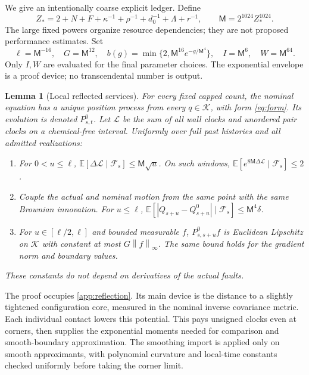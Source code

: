 \documentclass[11pt]{article}
\numberwithin{equation}{section}
\newtheorem{lemma}[theorem]{Lemma}
\theoremstyle{definition}
\theoremstyle{remark}\newtheorem{remark}[theorem]{Remark}
\newcommand{\E}{\mathbb E}
\newcommand{\K}{\mathcal K}
\newcommand{\norm}[1]{\left\|#1\right\|}
\begin{document}
We give an intentionally coarse explicit ledger. Define
\begin{equation}\label{eq:master}
 Z_*=2+N+F+\kappa^{-1}+\rho^{-1}+d_0^{-1}+\Lambda+r^{-1},
 \qquad \mathsf M=2^{1024}Z_*^{1024}.
\end{equation}
The large fixed powers organize resource dependencies; they are not proposed
performance estimates. Set
\begin{equation}\label{eq:services}
 \ell=\mathsf M^{-16},\quad G=\mathsf M^{12},\quad
 b(g)=\min\{2,\mathsf M^{16}e^{-g/\mathsf M^4}\},\quad
 I=\mathsf M^6,\quad W=\mathsf M^{64}.
\end{equation}
Only $I,W$ are evaluated for the final parameter choices. The exponential
envelope is a proof device; no transcendental number is output.

\begin{lemma}[Local reflected services]\label{lem:localservices}
For every fixed capped count, the nominal equation has a unique position
process from every $q\in\K$, with form \eqref{eq:form}. Its evolution is
denoted $P^0_{s,t}$. Let $\mathcal L$ be the sum of all wall clocks and
unordered pair clocks on a chemical-free interval.
Uniformly over full past histories and all admitted realizations:
\begin{enumerate}[label=(\roman*)]
\item For $0<u\le\ell$, $\E[\Delta\mathcal L\mid\mathcal F_s]
\le\mathsf M\sqrt u$. On such windows,
$\E[e^{8\mathsf M\Delta\mathcal L}\mid\mathcal F_s]\le2$.
\item Couple the actual and nominal motion from the same point with the
same Brownian innovation. For $u\le\ell$,
$\E[|Q_{s+u}-Q^0_{s+u}|\mid\mathcal F_s]\le\mathsf M^4\delta$.
\item For $u\in[\ell/2,\ell]$ and bounded measurable $f$,
$P^0_{s,s+u}f$ is Euclidean Lipschitz on $\K$ with constant at most
$G\norm f_\infty$. The same bound holds for the gradient norm and
boundary values.
\end{enumerate}
These constants do not depend on derivatives of the actual faults.
\end{lemma}

The proof occupies \cref{app:reflection}. Its main device is the distance
to a slightly tightened configuration core, measured in the nominal inverse
covariance metric. Each individual contact lowers this potential. This pays
unsigned clocks even at corners, then supplies the exponential moments
needed for comparison and smooth-boundary approximation. The smoothing
import is applied only on smooth approximants, with polynomial curvature
and local-time constants checked uniformly before taking the corner limit.
\end{document}
